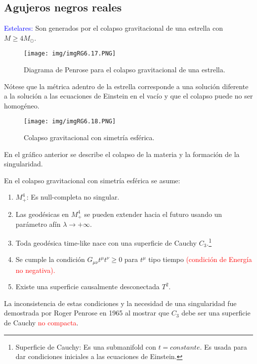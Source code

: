 \documentclass[../main]{subfiles}
\begin{document}
\begin{adjustwidth}{0pt}{-100pt}
\section{Agujeros negros reales}\label{part6.6}

\textcolor{blue}{Estelares:} Son generados por el colapso gravitacional de una estrella con $M\geq 4 M_{\odot}$.
\begin{figure}[H]
    \begin{adjustwidth}{0pt}{-100pt}
    \centering
    \texttt{[image: img/imgRG6.17.PNG]}
    \caption{Diagrama de Penrose para el colapso gravitacional de una estrella.}
    \end{adjustwidth}
\end{figure}

Nótese que la métrica adentro de la estrella corresponde a una solución diferente a la solución a las ecuaciones de Einstein en el vacío y que el colapso puede no ser homogéneo.
\begin{figure}[H]
    \begin{adjustwidth}{0pt}{-100pt}
    \centering
    \texttt{[image: img/imgRG6.18.PNG]}
    \caption{Colapso gravitacional con simetría esférica.}
    \end{adjustwidth}
\end{figure}

En el gráfico anterior se describe el colapso de la materia y la formación de la singularidad.

En el colapso gravitacional con simetría esférica se asume:
\begin{enumerate}
    \item $M^4_+$: Es null-completa no singular.
    \item Las geodésicas en $M^4_+$ se pueden extender hacia el futuro usando un parámetro afín $\lambda \rightarrow + \infty$.
    \item Toda geodésica time-like nace con una superficie de Cauchy $C_3$.\footnote{Superficie de Cauchy: Es una submanifold con $t=constante$. Es usada para dar condiciones iniciales a las ecuaciones de Einstein.}
    \item Se cumple la condición $G_{\mu\nu}t^{\mu}t^{\nu}\geq 0$ para $t^{\mu}$ tipo tiempo \textcolor{red}{(condición de Energía no negativa).}
    \item Existe una superficie causalmente desconectada $T^2$.
\end{enumerate}

La inconsistencia de estas condiciones y la necesidad de una singularidad fue demostrada por Roger Penrose en 1965 al mostrar que $C_3$ debe ser una superficie de Cauchy \textcolor{red}{no compacta}.


\end{adjustwidth}
\end{document}
